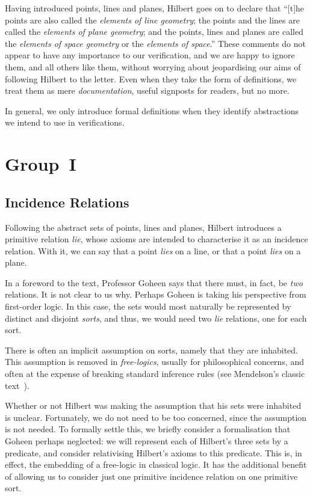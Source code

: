 Having introduced points, lines and planes, Hilbert goes on to declare that ``[t]he points are also called the \emph{elements of line geometry}; the points and the lines are called the \emph{elements of plane geometry}; and the points, lines and planes are called the \emph{elements of space geometry} or the \emph{elements of space}.'' These comments do not appear to have any importance to our verification, and we are happy to ignore them, and all others like them, without worrying about jeopardising our aims of following Hilbert to the letter. Even when they take the form of definitions, we treat them as mere \emph{documentation}, useful signposts for readers, but no more.

In general, we only introduce formal definitions when they identify abstractions we intend to use in verifications.

\section{Group~I}
\subsection{Incidence Relations}
Following the abstract sets of points, lines and planes, Hilbert introduces a primitive  relation \emph{lie}, whose axioms are intended to characterise it as an incidence relation. With it, we can say that a point \emph{lies} on a line, or that a point \emph{lies} on a plane.

In a foreword to the text, Professor Goheen says that there must, in fact, be \emph{two} relations. It is not clear to us why. Perhaps Goheen is taking his perspective from first-order logic. In this case, the sets would most naturally be represented by distinct and disjoint \emph{sorts}, and thus, we would need two \emph{lie} relations, one for each sort.

There is often an implicit assumption on sorts, namely that they are inhabited. This assumption is removed in \emph{free-logics}, usually for philosophical concerns, and often at the expense of breaking standard inference rules (see Mendelson's classic text~\cite{Mendelson}).

Whether or not Hilbert was making the assumption that his sets were inhabited is unclear. Fortunately, we do not need to be too concerned, since the assumption is not needed. To formally settle this, we briefly consider a formalisation that Goheen perhaps neglected: we will represent each of Hilbert's three sets by a predicate, and consider relativising Hilbert's axioms to this predicate. This is, in effect, the embedding of a free-logic in classical logic. It has the additional benefit of allowing us to consider just one primitive incidence relation on one primitive sort.

